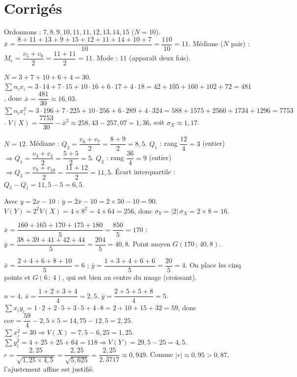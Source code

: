 \section{Corrigés}

Ordonnons : $7,8,9,10,11,11,12,13,14,15$ ($N=10$).
$\bar x=\dfrac{8+11+13+9+15+12+11+14+10+7}{10}=\dfrac{110}{10}=11$.
Médiane ($N$ pair) : $M_e=\dfrac{v_5+v_6}{2}=\dfrac{11+11}{2}=11$.
Mode : $11$ (apparaît deux fois).

$N=3+7+10+6+4=30$.
$\sum n_ix_i=3\!\cdot\!14+7\!\cdot\!15+10\!\cdot\!16+6\!\cdot\!17+4\!\cdot\!18
=42+105+160+102+72=481$, donc $\bar x=\dfrac{481}{30}\approx16{,}03$.
$\sum n_ix_i^2=3\!\cdot\!196+7\!\cdot\!225+10\!\cdot\!256+6\!\cdot\!289+4\!\cdot\!324
=588+1575+2560+1734+1296=7753$.
$V(X)=\dfrac{7753}{30}-\bar x^2\approx258{,}43-257{,}07=1{,}36$, soit $\sigma_X\approx1{,}17$.

$N=12$. Médiane : $Q_2=\dfrac{v_6+v_7}{2}=\dfrac{8+9}{2}=8{,}5$.
$Q_1$ : rang $\dfrac{12}{4}=3$ (entier) $\Rightarrow Q_1=\dfrac{v_3+v_4}{2}=\dfrac{5+5}{2}=5$.
$Q_3$ : rang $\dfrac{36}{4}=9$ (entier) $\Rightarrow Q_3=\dfrac{v_9+v_{10}}{2}=\dfrac{11+12}{2}=11{,}5$.
Écart interquartile : $Q_3-Q_1=11{,}5-5=6{,}5$.

Avec $y=2x-10$ : $\bar y=2\bar x-10=2\times50-10=90$.
$V(Y)=2^2V(X)=4\times8^2=4\times64=256$, donc $\sigma_Y=|2|\,\sigma_X=2\times8=16$.

$\bar x=\dfrac{160+165+170+175+180}{5}=\dfrac{850}{5}=170$ ;
$\bar y=\dfrac{38+39+41+42+44}{5}=\dfrac{204}{5}=40{,}8$.
Point moyen $G(170\,;\,40{,}8)$.

$\bar x=\dfrac{2+4+6+8+10}{5}=6$ ; $\bar y=\dfrac{1+3+4+6+6}{5}=\dfrac{20}{5}=4$.
On place les cinq points et $G(6\,;\,4)$, qui est bien au centre du nuage (croissant).

$n=4$, $\bar x=\dfrac{1+2+3+4}{4}=2{,}5$, $\bar y=\dfrac{2+5+5+8}{4}=5$.
$\sum x_iy_i=1\!\cdot\!2+2\!\cdot\!5+3\!\cdot\!5+4\!\cdot\!8=2+10+15+32=59$, donc
$\mathrm{cov}=\dfrac{59}{4}-2{,}5\times5=14{,}75-12{,}5=2{,}25$.
$\sum x_i^2=30\Rightarrow V(X)=7{,}5-6{,}25=1{,}25$.
$\sum y_i^2=4+25+25+64=118\Rightarrow V(Y)=29{,}5-25=4{,}5$.
$r=\dfrac{2{,}25}{\sqrt{1{,}25\times4{,}5}}=\dfrac{2{,}25}{\sqrt{5{,}625}}=\dfrac{2{,}25}{2{,}3717}\approx0{,}949$.
Comme $|r|\approx0{,}95>0{,}87$, l'ajustement affine est justifié.


